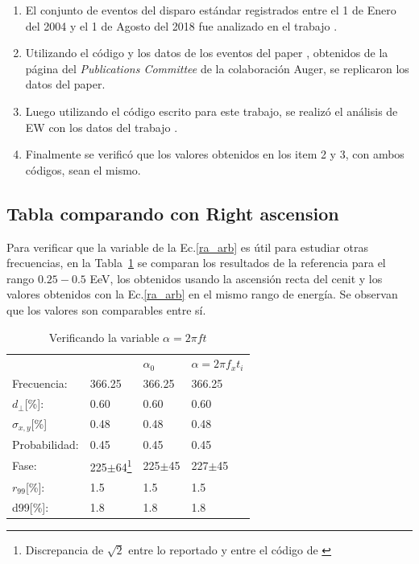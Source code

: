 \begin{enumerate}[noitemsep]
    \item El conjunto de eventos del disparo estándar registrados entre el 1 de Enero del 2004 y el 1 de Agosto del 2018 fue analizado en el trabajo \cite{Aab_2020}.
    \item Utilizando el código y los datos de los eventos del paper \cite{Aab_2020}, obtenidos de la página del \emph{Publications Committee} de la colaboración Auger, se replicaron los datos del paper. 
    \item Luego utilizando el código escrito para este trabajo, se realizó el análisis de EW con los datos del trabajo \cite{Aab_2020}. 
    \item Finalmente se verificó que los valores obtenidos en los item 2 y 3, con  ambos códigos, sean el mismo.
\end{enumerate}

\subsection*{Tabla comparando con Right ascension}

Para verificar que la variable de la Ec.\ref{ra_arb} es útil para estudiar otras frecuencias, en la Tabla~\ref{tab:comp_vars} se comparan los resultados de la referencia para el rango $0.25-0.5$ EeV, los obtenidos usando la ascensión recta del cenit y los valores obtenidos con la Ec.\ref{ra_arb} en el mismo rango de energía. Se observan que los valores son comparables entre sí.
\begin{table}[H]
    \begin{small}
        \begin{center}
            \begin{tabular}[c]{l|l|l|l}
                                    & \cite{Aab_2020} & $\alpha_0$   & $\alpha=2\pi f_xt_i$   \\ 
                Frecuencia:         & 366.25          &  366.25      &  366.25            \\
                $d_\perp$[\%]:      & 0.60            &  0.60        &  0.60              \\
                $\sigma_{x,y}$[\%]  & 0.48           &  0.48        &  0.48              \\ 
                Probabilidad:       & 0.45            &  0.45        &  0.45              \\
                Fase:               & 225$\pm$64\footnote[3]{Discrepancia de $\sqrt{2}$ entre lo reportado y entre el código de \cite{Aab_2020}} 
                                    & 225$\pm$45   &  227$\pm$45          \\
                $r_{99}$[\%]:       & 1.5           &  1.5       &  1.5             \\
                d99[\%]:            & 1.8           &  1.8       &  1.8             \\
            \end{tabular}
        \end{center}
        \caption{Verificando la  variable $\alpha=2\pi ft$}
        \label{tab:comp_vars}
    \end{small}
\end{table}

